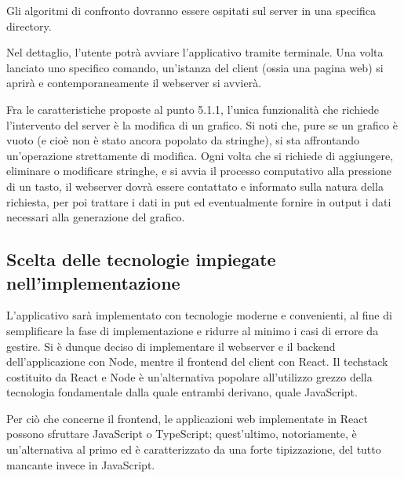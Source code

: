         \vspace{3mm}
        
        Gli algoritmi di confronto dovranno essere ospitati sul server in una specifica directory. 
        
        \vspace{3mm}
        
        Nel dettaglio, l'utente potrà avviare l'applicativo tramite terminale. Una volta lanciato uno specifico comando, un'istanza del client (ossia una pagina web) si aprirà e contemporaneamente il webserver si avvierà.
        
        \vspace{3mm}
        
        Fra le caratteristiche proposte al punto 5.1.1, l'unica funzionalità che richiede l'intervento del server è la modifica di un grafico. Si noti che, pure se un grafico è vuoto (e cioè non è stato ancora popolato da stringhe), si sta affrontando un'operazione strettamente di modifica. Ogni volta che si richiede di aggiungere, eliminare o modificare stringhe, e si avvia il processo computativo alla pressione di un tasto, il webserver dovrà essere contattato e informato sulla natura della richiesta, per poi trattare i dati in put ed eventualmente fornire in output i dati necessari alla generazione del grafico.
    
    \subsection{Scelta delle tecnologie impiegate nell'implementazione}
    
        L'applicativo sarà implementato con tecnologie moderne e convenienti, al fine di semplificare la fase di implementazione e ridurre al minimo i casi di errore da gestire. Si è dunque deciso di implementare il webserver e il backend dell'applicazione con Node, mentre il frontend del client con React. Il techstack costituito da React e Node è un'alternativa popolare all'utilizzo grezzo della tecnologia fondamentale dalla quale entrambi derivano, quale JavaScript.  
        
        \vspace{3mm}
        
        Per ciò che concerne il frontend, le applicazioni web implementate in React possono sfruttare JavaScript o TypeScript; quest'ultimo, notoriamente, è un'alternativa al primo ed è caratterizzato da una forte tipizzazione, del tutto mancante invece in JavaScript. 
        
